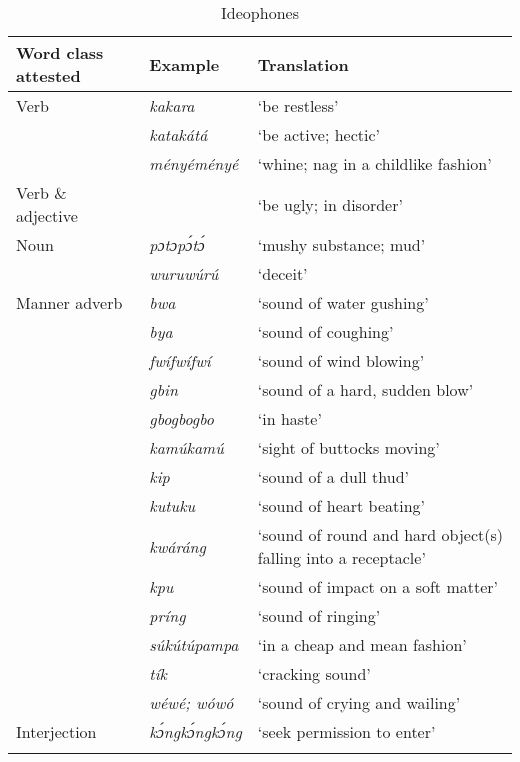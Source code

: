 \begin{table}
\caption{Ideophones}
\label{tab:key:12.1}

\begin{tabularx}{\textwidth}{llQ}
\lsptoprule

Word class attested & Example & Translation\\
\midrule 
Verb & \itshape kakara & ‘be restless’\\
& \itshape katakátá & ‘be active; hectic’\\
& \itshape ményéményé & ‘whine; nag in a childlike fashion’\\

\tablevspace
Verb \& adjective & \itshape {} & ‘be ugly; in disorder’\\

\tablevspace
Noun & \itshape pɔtɔpɔ́tɔ́ & ‘mushy substance; mud’\\
& \itshape wuruwúrú & ‘deceit’\\

\tablevspace
Manner adverb & \itshape bwa & ‘sound of water gushing’\\
& \itshape bya & ‘sound of coughing’\\
& \itshape fwífwífwí & ‘sound of wind blowing’\\
& \itshape gbin & ‘sound of a hard, sudden blow’\\
& \itshape gbogbogbo & ‘in haste’\\
& \itshape kamúkamú & ‘sight of buttocks moving’\\
& \itshape kip & ‘sound of a dull thud’\\
& \itshape kutuku & ‘sound of heart beating’\\
& \itshape kwáráng & ‘sound of round and hard object(s) falling into a receptacle’\\
& \itshape kpu & ‘sound of impact on a soft matter’\\
& \itshape príng & ‘sound of ringing’\\
& \itshape súkútúpampa & ‘in a cheap and mean fashion’\\
& \itshape tík & ‘cracking sound’\\
& \itshape wéwé; wówó & ‘sound of crying and wailing’\\

\tablevspace
Interjection & \itshape kɔ́ngkɔ́ngkɔ́ng & ‘seek permission to enter’\\
\lspbottomrule
\end{tabularx}
\end{table}
